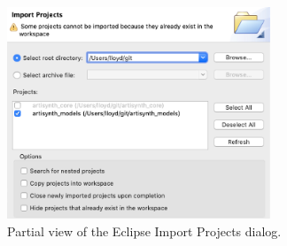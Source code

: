 \begin{figure}
\begin{center}
  \else
     \includegraphics[width=0.7\textwidth]{images/EclipseImportProjectsMacOS}
  \fi
\fi   
\end{center}
\caption{Partial view of the Eclipse Import Projects dialog.}%
\label{EclipseImportProjects:fig}
\end{figure}

